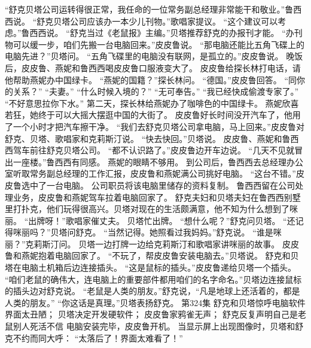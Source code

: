 \documentclass[a4paper,12pt,UTF8,twoside]{ctexbook}
\begin{document}
        “舒克贝塔公司运转得很正常，我任命的一位常务副总经理非常能干和敬业。”鲁西西说。  
        “舒克贝塔公司应该办一本少儿刊物。”歌唱家提议。  
        “这个建议可以考虑。”鲁西西说。  
        “舒克当过《老鼠报》主编。”贝塔推荐舒克的办报刊才能。  
        “办刊物可以缓一步，咱们先搬一台电脑回来。”皮皮鲁说。  
        “那电脑还能比五角飞碟上的电脑先进？”贝塔问。  
        “五角飞碟里的电脑没有联网，是孤立的。”皮皮鲁说。  
        晚饭后，皮皮鲁、燕妮和鲁西西喝皮皮鲁口服液变大了。        
        皮皮鲁给探长林打电话，请他帮助燕妮办中国绿卡。  
        “燕妮的国籍？”探长林问。  
        “德国。”皮皮鲁回答。  
        “同你的关系？”  
        “夫妻。”  
        “什么时候入境的？”  
        “无可奉告。”  
        “我已经快成偷渡专家了。”  
        “不好意思拉你下水。”  
        第二天，探长林给燕妮办了咖啡色的中国绿卡。  
        燕妮欣喜若狂，她终于可以大摇大摆逛中国的大街了。  
        皮皮鲁好长时间没开汽车了，他用了一个小时才把汽车擦干净。  
        “我们去舒克贝塔公司拿电脑，马上回来。”皮皮鲁对舒克、贝塔、歌唱家和克莉斯汀说。  
        “快去快回。”贝塔说。  
        皮皮鲁、燕妮和鲁西西驾车前往舒克贝塔公司。  
        “都不认识路了。”皮皮鲁边开车边说。  
        “几天不见就冒出一座楼。”鲁西西有同感。  
        燕妮的眼睛不够用。  
        到公司后，鲁西西去总经理办公室听取常务副总经理的工作汇报，皮皮鲁和燕妮满公司挑好电脑。        
        “这台不错。”皮皮鲁选中了一台电脑。  
        公司职员将该电脑里储存的资料复制。  
        鲁西西留在公司处理业务，皮皮鲁和燕妮驾车拉着电脑回家了。  
        舒克夫妇和贝塔夫妇在鲁西西别墅里打扑克，他们玩得很高兴。贝塔对现在的生活颇满意，他不知为什么想到了咪丽。  
        “出牌呀！”歌唱家催丈夫。  
        贝塔忙出牌。  
        “想什么呢？”舒克问贝塔。  
        “还记得咪丽吗？”贝塔问舒克。  
        “当然记得。她照看过我妈妈。”舒克说。  
        “谁是咪丽？”克莉斯汀问。  
        贝塔一边打牌一边给克莉斯汀和歌唱家讲咪丽的故事。  
        皮皮鲁和燕妮抱着电脑回家了。  
        “不玩了，帮皮皮鲁安装电脑去。”贝塔说。  
        舒克和贝塔在电脑土机箱后边连接插头。  
        “这是鼠标的插头。”皮皮鲁递给贝塔一个插头。  
        “咱们老鼠的确伟大，连电脑上的重要部件都用咱们的名字命名。”贝塔边连接鼠标的插头边对舒克说。  
        “老鼠是人类的朋友。”舒克说，“凡是地球上还活着的，都是人类的朋友。”  
        “你这话是真理。”贝塔表扬舒克。          第324集  
        舒克和贝塔惊呼电脑软件界面太丑陋；  
        贝塔决定开发硬软件；  
        皮皮鲁家鸦雀无声；  
        舒克反复声明自己是老鼠别人死活不信    
        电脑安装完毕，皮皮鲁开机。  
        当显示屏上出现图像时，贝塔和舒克不约而同大呼：  
        “太落后了！界面太难看了！”  
\end{document}
